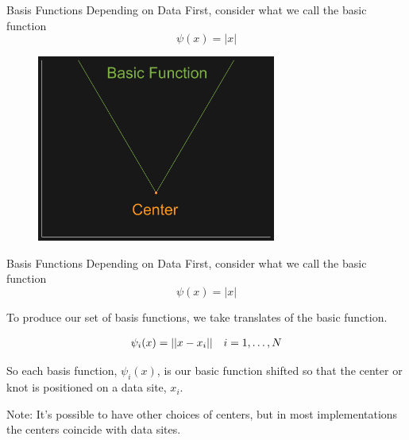 \documentclass[12pt,t]{beamer}
\newcommand{\subt}[1]{{\footnotesize \color{subtitle} {#1}}}
\begin{document}
\begin{frame}{Basis Functions Depending on Data}
First, consider what we call the \subt{basic function}\\
\begin{equation*}
\psi(x)=|x|
\end{equation*}

\begin{figure}
\includegraphics[width=0.7\textwidth, keepaspectratio]{basicfun.png}
\end{figure}

\end{frame}

\begin{frame}{Basis Functions Depending on Data}
First, consider what we call the \subt{basic function}\\
\begin{equation*}
\psi(x)=|x|
\end{equation*}

To produce our set of basis functions, we take \subt{translates} of the basic function.

\begin{align*}
&\psi_i(x)=||x-x_i|| &i=1, \mathellipsis, N
\end{align*}

So each basis function, $\psi_i(x)$, is our basic function shifted so that the \subt{center} or \subt{knot} is positioned on a data site, $x_i$.
\bigskip

\subt{Note:} It's possible to have other choices of centers, but in most implementations the centers coincide with data sites.

\end{frame}
\end{document}
